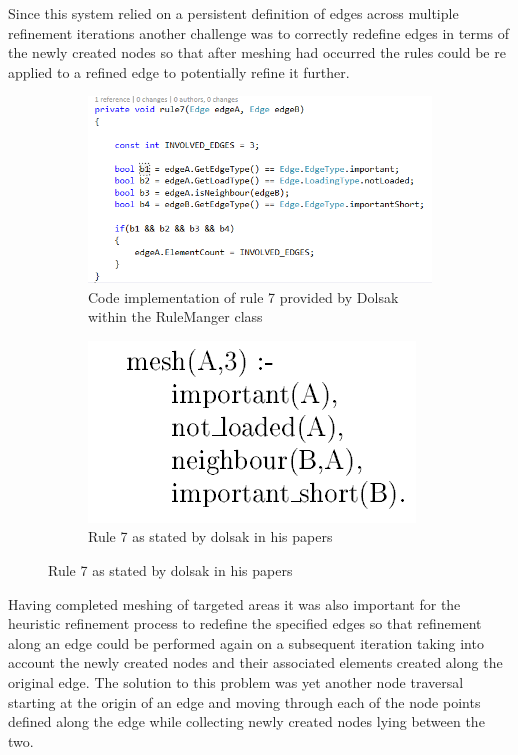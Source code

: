 \noindent
Since this system relied on a persistent definition of edges across multiple refinement iterations another challenge was to correctly redefine edges in terms of the newly created nodes so that after meshing had occurred the rules could be re applied to a refined edge to potentially refine it further.

\begin{figure}[H]
\centering
\begin{subfigure}{.5\textwidth}
  \centering
  \includegraphics[width=0.9\linewidth]{../Graphics/Rule7Implementation.png}
  \caption{Code implementation of rule 7 provided by Dolsak within the RuleManger class}
  \label{fig:sub1}
\end{subfigure}%
\begin{subfigure}{.5\textwidth}
  \centering
  \includegraphics[width=0.7\linewidth]{../Graphics/Rule7Dolsak.png}
  \caption{Rule 7 as stated by dolsak in his papers \cite{appOfILPToFEMeshDesign}}
  \label{fig:sub2}
\end{subfigure}
\label{fig:test}
\end{figure}

\noindent
Having completed meshing of targeted areas it was also important for the heuristic refinement process to redefine the specified edges so that refinement along an edge could be performed again on a subsequent iteration taking into account the newly created nodes and their associated elements created along the original edge. The solution to this problem was yet another node traversal starting at the origin of an edge and moving through each of the node points defined along the edge while collecting newly created nodes lying between the two. \\


